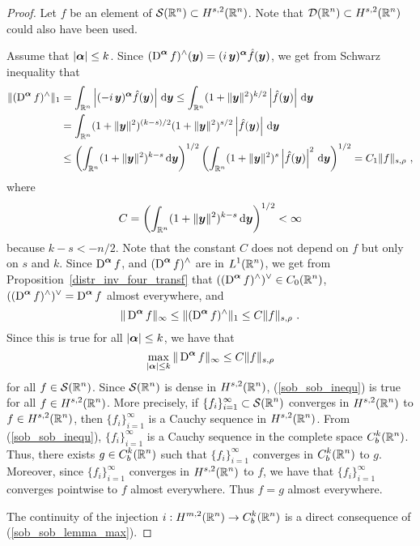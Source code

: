 \begin{proof}
Let $f$ be an element of $\displaystyle \mathcal{S}(\mathbb{R}^n) \subset H^{s,2}(\mathbb{R}^n)$.
Note that $\displaystyle \mathcal{D}(\mathbb{R}^n) \subset H^{s,2}(\mathbb{R}^n)$ could also
have been used.

Assume that $|{\bm{\alpha}}|\leq k$.
Since $\displaystyle (\operatorname{D}^{{\bm{\alpha}}} f)^\wedge({\bm{y}}) =
(i\,{\bm{y}})^{{\bm{\alpha}}} \hat{f}({\bm{y}})$, we get from Schwarz
inequality that
\begin{align*}
\| (\operatorname{D}^{{\bm{\alpha}}} f)^\wedge \|_1 &= 
\int_{\mathbb{R}^n} \left| (-i\,{\bm{y}})^{{\bm{\alpha}}} \hat{f}({\bm{y}}) \right|
\,\mathrm{d}{{\bm{y}}}
\leq \int_{\mathbb{R}^n} (1+\|{\bm{y}}\|^2)^{k/2} \left| \hat{f}({\bm{y}}) \right|
\,\mathrm{d}{{\bm{y}}} \\
& =\int_{\mathbb{R}^n} (1+\|{\bm{y}}\|^2)^{(k-s)/2}
 (1+\|{\bm{y}}\|^2)^{s/2} \left| \hat{f}({\bm{y}}) \right| \,\mathrm{d}{{\bm{y}}} \\
&\leq \left( \int_{\mathbb{R}^n} (1+\|{\bm{y}}\|^2)^{k-s} \,\mathrm{d}{{\bm{y}}} \right)^{1/2}
\left(\int_{\mathbb{R}^n} (1+\|{\bm{y}}\|^2)^s \left|\hat{f}({\bm{y}}) \right|^2
\,\mathrm{d}{{\bm{y}}}\right)^{1/2}
= C_1 \| f \|_{s,\rho} \ ,
\end{align*}
where
\[
C = \left( \int_{\mathbb{R}^n} (1+\|{\bm{y}}\|^2)^{k-s} \,\mathrm{d}{{\bm{y}}} \right)^{1/2}
< \infty
\]
because $k-s < -n/2$.  Note that the constant $C$ does not depend on
$f$ but only on $s$ and $k$.  Since $\displaystyle \operatorname{D}^{{\bm{\alpha}}} f$, and
$\displaystyle (\operatorname{D}^{{\bm{\alpha}}} f)^\wedge$ are in
$\displaystyle L^1(\mathbb{R}^n)$, we
get from Proposition~\ref{distr_inv_four_transf} that
$\displaystyle ((\operatorname{D}^{{\bm{\alpha}}} f)^\wedge)^\vee \in C_0(\mathbb{R}^n)$,
$\displaystyle ((\operatorname{D}^{{\bm{\alpha}}} f)^\wedge)^\vee
= \operatorname{D}^{{\bm{\alpha}}} f$ almost
everywhere, and
\[
\|\operatorname{D}^{{\bm{\alpha}}} f\|_\infty \leq \|(\operatorname{D}^{{\bm{\alpha}}} f)^\wedge \|_1
\leq C \| f \|_{s,\rho} \ .
\]
Since this is true for all $|{\bm{\alpha}}|\leq k$, we have that
\begin{equation}\label{sob_sob_inequ}
\max_{|{\bm{\alpha}}|\leq k} \|\operatorname{D}^{{\bm{\alpha}}} f\|_{\infty}
\leq C \| f \|_{s,\rho}
\end{equation}
for all $\displaystyle f \in \mathcal{S}(\mathbb{R}^n)$.  Since
$\displaystyle \mathcal{S}(\mathbb{R}^n)$ is dense in
$\displaystyle H^{s,2}(\mathbb{R}^n)$, (\ref{sob_sob_inequ}) is true for all
$\displaystyle f \in H^{s,2}(\mathbb{R}^n)$.  More precisely, if
$\displaystyle \{f_i\}_{i=1}^\infty \subset \mathcal{S}(\mathbb{R}^n)$ converges in
$\displaystyle H^{s,2}(\mathbb{R}^n)$ to $\displaystyle f \in H^{s,2}(\mathbb{R}^n)$, then
$\displaystyle \{f_i\}_{i=1}^\infty$ is a Cauchy sequence in
$\displaystyle H^{s,2}(\mathbb{R}^n)$.
From (\ref{sob_sob_inequ}), $\displaystyle \{f_i\}_{i=1}^\infty$ is a Cauchy
sequence in the complete space $\displaystyle C_b^k(\mathbb{R}^n)$.  Thus, there exists
$\displaystyle g \in C_b^k(\mathbb{R}^n)$ such that
$\displaystyle \{f_i\}_{i=1}^\infty$ converges in
$\displaystyle C_b^k(\mathbb{R}^n)$ to $g$.  Moreover, since
$\displaystyle \{f_i\}_{i=1}^\infty $ converges in
$\displaystyle H^{s,2}(\mathbb{R}^n)$ to $f$, we have
that $\displaystyle \{f_i\}_{i=1}^\infty $ converges pointwise to $f$ almost
everywhere.  Thus $f = g$ almost everywhere.

The continuity of the injection
$\displaystyle i:H^{m,2}(\mathbb{R}^n) \to C_b^k(\mathbb{R}^n)$ is a direct
consequence of (\ref{sob_sob_lemma_max}).
\end{proof}

